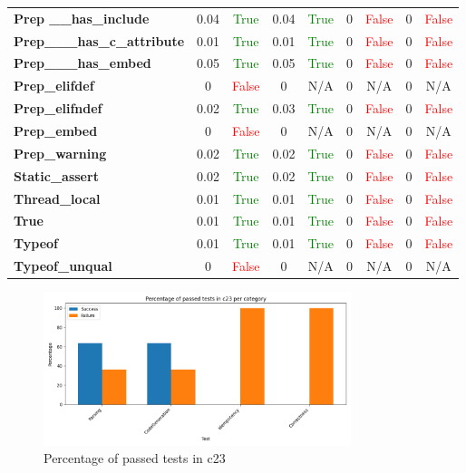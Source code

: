 \documentclass{article}
\begin{document}
\begin{xltabular}{\textwidth}{lcccccccc}
\textbf{{\fontsize{10}{12}\selectfont Prep \_\_has\_include}}& 0.04&\textcolor{green}{True}& 0.04&\textcolor{green}{True}& 0&\textcolor{red}{False}& 0&\textcolor{red}{False} \\[0.5ex]
\textbf{{\fontsize{10}{12}\selectfont Prep\_\_\_has\_c\_attribute}}& 0.01&\textcolor{green}{True}& 0.01&\textcolor{green}{True}& 0&\textcolor{red}{False}& 0&\textcolor{red}{False} \\[0.5ex]
\textbf{{\fontsize{10}{12}\selectfont Prep\_\_\_has\_embed}}& 0.05&\textcolor{green}{True}& 0.05&\textcolor{green}{True}& 0&\textcolor{red}{False}& 0&\textcolor{red}{False} \\[0.5ex]
\textbf{{\fontsize{10}{12}\selectfont Prep\_elifdef}}& 0&\textcolor{red}{False}& 0&N/A& 0&N/A& 0&N/A \\[0.5ex]
\textbf{{\fontsize{10}{12}\selectfont Prep\_elifndef}}& 0.02&\textcolor{green}{True}& 0.03&\textcolor{green}{True}& 0&\textcolor{red}{False}& 0&\textcolor{red}{False} \\[0.5ex]
\textbf{{\fontsize{10}{12}\selectfont Prep\_embed}}& 0&\textcolor{red}{False}& 0&N/A& 0&N/A& 0&N/A \\[0.5ex]
\textbf{{\fontsize{10}{12}\selectfont Prep\_warning}}& 0.02&\textcolor{green}{True}& 0.02&\textcolor{green}{True}& 0&\textcolor{red}{False}& 0&\textcolor{red}{False} \\[0.5ex]
\textbf{{\fontsize{10}{12}\selectfont Static\_assert}}& 0.02&\textcolor{green}{True}& 0.02&\textcolor{green}{True}& 0&\textcolor{red}{False}& 0&\textcolor{red}{False} \\[0.5ex]
\textbf{{\fontsize{10}{12}\selectfont Thread\_local}}& 0.01&\textcolor{green}{True}& 0.01&\textcolor{green}{True}& 0&\textcolor{red}{False}& 0&\textcolor{red}{False} \\[0.5ex]
\textbf{{\fontsize{10}{12}\selectfont True}}& 0.01&\textcolor{green}{True}& 0.01&\textcolor{green}{True}& 0&\textcolor{red}{False}& 0&\textcolor{red}{False} \\[0.5ex]
\textbf{{\fontsize{10}{12}\selectfont Typeof}}& 0.01&\textcolor{green}{True}& 0.01&\textcolor{green}{True}& 0&\textcolor{red}{False}& 0&\textcolor{red}{False} \\[0.5ex]
\textbf{{\fontsize{10}{12}\selectfont Typeof\_unqual}}& 0&\textcolor{red}{False}& 0&N/A& 0&N/A& 0&N/A \\[0.5ex]
\bottomrule
\end{xltabular}
\newpage
\begin{figure}[h!]
\centering
\includegraphics[width=0.8\textwidth]{../reports/artisan/images/c23_percentage.png}
\caption{Percentage of passed tests in c23}
\label{fig:c23_percentage}
\end{figure}
\newpage
\end{document}
